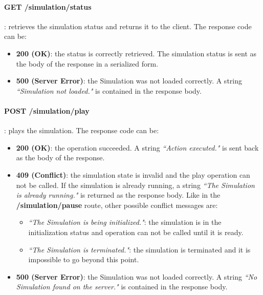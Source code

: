 \paragraph{GET /simulation/status}: retrieves the simulation status and returns it to the client. The response code can be:
\begin{itemize}
	\item \textbf{200 (OK)}: the status is correctly retrieved. The simulation status is sent as the body of the response in a serialized form.
	\item \textbf{500 (Server Error)}: the Simulation was not loaded correctly. A string \textit{``Simulation not loaded."} is contained in the response body.
\end{itemize}
\paragraph{POST /simulation/play}: plays the simulation. The response code can be:
\begin{itemize}
	\item \textbf{200 (OK)}: the operation succeeded. A string \textit{``Action executed."} is sent back as the body of the response.
	\item \textbf{409 (Conflict)}: the simulation state is invalid and the play operation can not be called. If the simulation is already running, a string \textit{``The Simulation is already running."} is returned as the response body. Like in the \textbf{/simulation/pause} route, other possible conflict messages are:
	\begin{itemize}
		\item \textit{``The Simulation is being initialized."}: the simulation is in the initialization status and operation can not be called until it is ready.
		\item \textit{``The Simulation is terminated."}: the simulation is terminated and it is impossible to go beyond this point.
	\end{itemize}
	\item \textbf{500 (Server Error)}: the Simulation was not loaded correctly. A string \textit{``No Simulation found on the server."} is contained in the response body.
\end{itemize}

